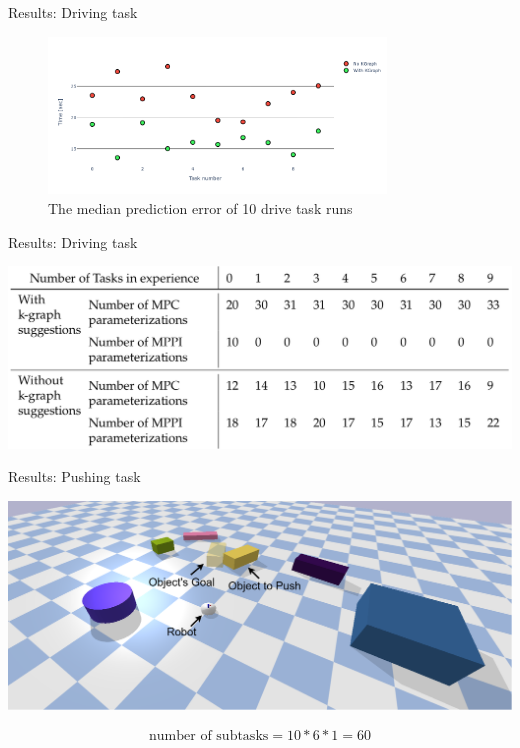 \begin{frame}[fragile]{Results: Driving task} 
\begin{center}
  \begin{figure}
  \includegraphics[width=0.8\textwidth]{figures/results/random_drive_time_vs}
  \caption{The median prediction error of 10 drive task runs}
  \end{figure}
\end{center}
\end{frame}

\begin{frame}[fragile]{Results: Driving task} 
\begin{center}
\includegraphics[width=1.0\textwidth]{figures/results/random_drive_para}
\end{center}
\end{frame}

\begin{frame}[fragile]{Results: Pushing task} 
  \vspace{-0.2cm}

\begin{center}
   \includegraphics[width=1.0\textwidth]{figures/results/random_1.drawio}
\end{center}

\vspace{-0.6cm}
\[\textrm{number of subtasks} = 10 * 6 * 1 = 60\]
\end{frame}


